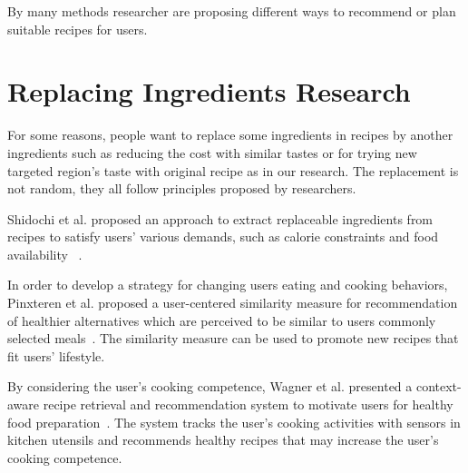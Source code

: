 By many methods researcher are proposing different ways to recommend or plan suitable recipes for users.  

\section{Replacing Ingredients Research}

For some reasons, people want to replace some ingredients in recipes by another ingredients such as reducing the cost with similar tastes or for trying new targeted region's taste with original recipe as in our research. The replacement is not random, they all follow principles proposed by researchers.

Shidochi et al. proposed an approach to extract replaceable
ingredients from recipes to satisfy users' various demands, such as calorie constraints and food availability ~\cite{Shidochi:2009:FRM:1630995.1630998}. 

In order to develop a strategy for changing users eating and cooking behaviors, Pinxteren et al. proposed a user-centered similarity measure for recommendation of healthier alternatives which are perceived to be similar to users commonly selected meals~\cite{vanPinxteren:2011:DRS:1943403.1943422}. The similarity measure can be used to promote new recipes that fit users’ lifestyle. 

By considering the user’s cooking competence, Wagner et al. presented a context-aware recipe retrieval and recommendation system to motivate users for healthy food preparation~\cite{Wagner:2011:GSH:1961634.1961644}. The system tracks the user’s cooking activities with sensors in kitchen utensils and recommends healthy recipes that may increase the user’s cooking competence.
